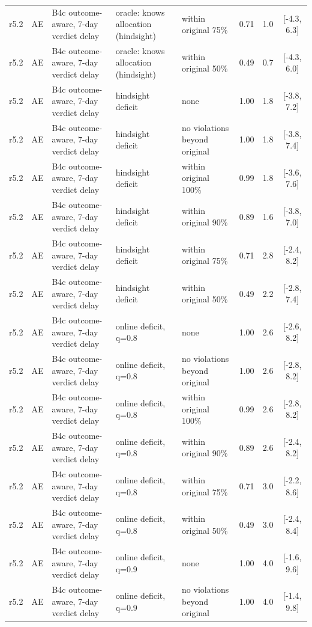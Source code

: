 \begin{longtable}{lllp{4.2cm}p{3.4cm}ccc}
r5.2 & AE & B4c outcome-aware, 7-day verdict delay & oracle: knows allocation (hindsight) & within original 75\% & 0.71 & 1.0 & [-4.3, 6.3] \\
r5.2 & AE & B4c outcome-aware, 7-day verdict delay & oracle: knows allocation (hindsight) & within original 50\% & 0.49 & 0.7 & [-4.3, 6.0] \\
r5.2 & AE & B4c outcome-aware, 7-day verdict delay & hindsight deficit & none & 1.00 & 1.8 & [-3.8, 7.2] \\
r5.2 & AE & B4c outcome-aware, 7-day verdict delay & hindsight deficit & no violations beyond original & 1.00 & 1.8 & [-3.8, 7.4] \\
r5.2 & AE & B4c outcome-aware, 7-day verdict delay & hindsight deficit & within original 100\% & 0.99 & 1.8 & [-3.6, 7.6] \\
r5.2 & AE & B4c outcome-aware, 7-day verdict delay & hindsight deficit & within original 90\% & 0.89 & 1.6 & [-3.8, 7.0] \\
r5.2 & AE & B4c outcome-aware, 7-day verdict delay & hindsight deficit & within original 75\% & 0.71 & 2.8 & [-2.4, 8.2] \\
r5.2 & AE & B4c outcome-aware, 7-day verdict delay & hindsight deficit & within original 50\% & 0.49 & 2.2 & [-2.8, 7.4] \\
r5.2 & AE & B4c outcome-aware, 7-day verdict delay & online deficit, q=0.8 & none & 1.00 & 2.6 & [-2.6, 8.2] \\
r5.2 & AE & B4c outcome-aware, 7-day verdict delay & online deficit, q=0.8 & no violations beyond original & 1.00 & 2.6 & [-2.8, 8.2] \\
r5.2 & AE & B4c outcome-aware, 7-day verdict delay & online deficit, q=0.8 & within original 100\% & 0.99 & 2.6 & [-2.8, 8.2] \\
r5.2 & AE & B4c outcome-aware, 7-day verdict delay & online deficit, q=0.8 & within original 90\% & 0.89 & 2.6 & [-2.4, 8.2] \\
r5.2 & AE & B4c outcome-aware, 7-day verdict delay & online deficit, q=0.8 & within original 75\% & 0.71 & 3.0 & [-2.2, 8.6] \\
r5.2 & AE & B4c outcome-aware, 7-day verdict delay & online deficit, q=0.8 & within original 50\% & 0.49 & 3.0 & [-2.4, 8.4] \\
r5.2 & AE & B4c outcome-aware, 7-day verdict delay & online deficit, q=0.9 & none & 1.00 & 4.0 & [-1.6, 9.6] \\
r5.2 & AE & B4c outcome-aware, 7-day verdict delay & online deficit, q=0.9 & no violations beyond original & 1.00 & 4.0 & [-1.4, 9.8] \\

\end{longtable}

